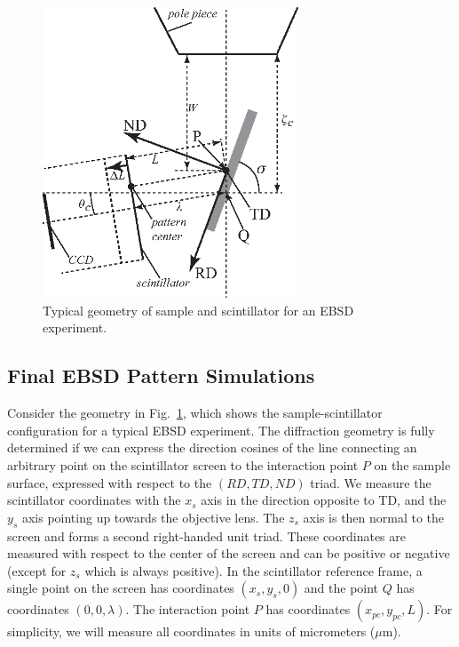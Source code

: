 \documentclass[DIV=calc, paper=letter, fontsize=11pt]{scrartcl}	 %
\begin{document}
\begin{figure}[t]
\centering
\includegraphics[width=3in]{figs/geometry}
\caption{Typical geometry of sample and scintillator for an EBSD experiment.} \label{fig:geometry}
\end{figure}


\subsection{Final EBSD Pattern Simulations \label{sec:EBSP}}
Consider the geometry in Fig.~\ref{fig:geometry}, which shows the sample-scintillator configuration 
for a typical EBSD experiment.  The diffraction geometry is fully determined if we can express the direction cosines of the line connecting
an arbitrary point on the scintillator screen to the interaction point $P$ on the sample surface, expressed with 
respect to the $(RD,TD,ND)$  triad.  We measure the scintillator coordinates with the $x_s$ axis in the direction 
opposite to TD, and the $y_s$ axis pointing up towards the objective lens.   The $z_s$ axis is then 
normal to the screen and forms a second right-handed unit triad.  These coordinates are measured with 
respect to the center of the screen and can be positive or negative (except for $z_s$ which is always positive).
In the scintillator reference frame, a single point on the screen has coordinates $(x_s,y_s,0)$ and the 
point $Q$ has coordinates $(0,0,\lambda)$.  The interaction point $P$ has coordinates $(x_{pc},y_{pc},L)$.
For simplicity, we will measure all coordinates in units of micrometers ($\mu$m).
\end{document}
